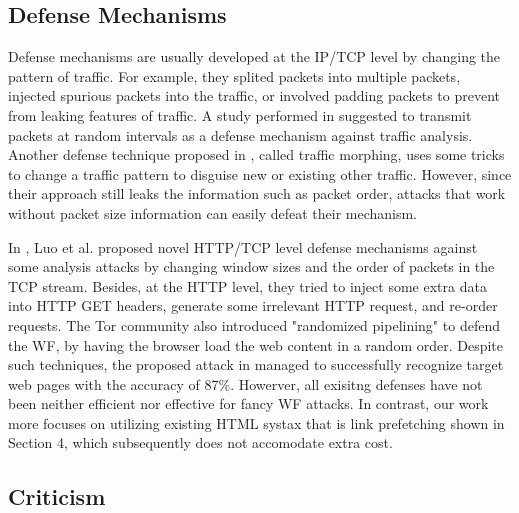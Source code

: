 

\subsection{Defense Mechanisms}

Defense mechanisms are usually developed at the IP/TCP level by changing the pattern of traffic.
For example, they splited packets into multiple packets, injected spurious packets into the traffic, or involved  padding packets to prevent from leaking features of traffic.
A study performed in \cite{fu2003} suggested to transmit packets at random intervals as a defense mechanism against traffic analysis.
Another defense technique proposed in \cite{wright2009}, called traffic morphing, uses some tricks to change a traffic pattern to disguise new or existing other traffic.
However, since their approach still leaks the information such as packet order, attacks that work without packet size information can easily defeat their mechanism.

In \cite{luo2011}, Luo et al. proposed novel HTTP/TCP level defense mechanisms against some analysis attacks by changing window sizes and the order of packets in the TCP stream.
Besides, at the HTTP level, they tried to inject some extra data into HTTP GET headers, generate some irrelevant HTTP request, and re-order requests.
The Tor community also introduced "randomized pipelining" \cite{perry11} to defend the WF, by having the browser load the web content in a random order.
Despite such techniques, the proposed attack in \cite{cai2012touching} managed to successfully recognize target web pages with the accuracy of 87\%.
Howerver, all exisitng defenses have not been neither efficient nor effective for fancy WF attacks. %
In contrast, our work more focuses on utilizing existing HTML systax that is link prefetching shown in Section 4, which subsequently does not accomodate extra cost.


\subsection{Criticism}

